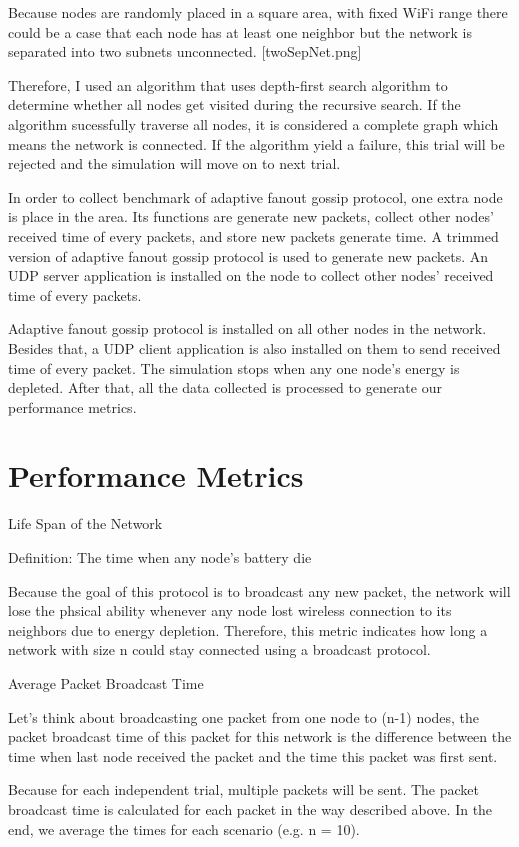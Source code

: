 Because nodes are randomly placed in a square area, with fixed WiFi range there could be a case that each node has at least one neighbor but the network is separated into two subnets unconnected. [twoSepNet.png]

Therefore, I used an algorithm that uses depth-first search algorithm to determine whether all nodes get visited during the recursive search. If the algorithm sucessfully traverse all nodes, it is considered a complete graph which means the network is connected. If the algorithm yield a failure, this trial will be rejected and the simulation will move on to next trial.

In order to collect benchmark of adaptive fanout gossip protocol, one extra node is place in the area. Its functions are generate new packets, collect other nodes' received time of every packets, and store new packets generate time. A trimmed version of adaptive fanout gossip protocol is used to generate new packets. An UDP server application is installed on the node to collect other nodes' received time of every packets.

Adaptive fanout gossip protocol is installed on all other nodes in the network. Besides that, a UDP client application is also installed on them to send received time of every packet. The simulation stops when any one node's energy is depleted. After that, all the data collected is processed to generate our performance metrics. 

\section{Performance Metrics}
Life Span of the Network

Definition: The time when any node's battery die

Because the goal of this protocol is to broadcast any new packet, the network will lose the phsical ability whenever any node lost wireless connection to its neighbors due to energy depletion. Therefore, this metric indicates how long a network with size n could stay connected using a broadcast protocol.

Average Packet Broadcast Time

Let's think about broadcasting one packet from one node to (n-1) nodes, the packet broadcast time of this packet for this network is the difference between the time when last node received the packet and the time this packet was first sent.

Because for each independent trial, multiple packets will be sent. The packet broadcast time is calculated for each packet in the way described above. In the end, we average the times for each scenario (e.g. n = 10). 

